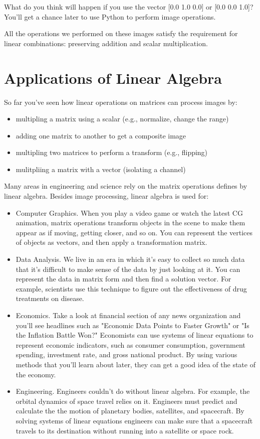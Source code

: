 What do you think will happen if you use the vector [0.0 1.0 0.0] or [0.0 0.0 1.0]? You'll get a chance later to use Python to perform image operations.

All the operations we performed on these images satisfy the requirement for linear combinations: preserving addition and scalar multiplication. 


\section{Applications of Linear Algebra}

So far you've seen how linear operations on matrices can process images by:
\begin{itemize}
\item multipling a matrix using a scalar (e.g., normalize, change the range)
\item adding one matrix to another to get a composite image 
\item multipling two matrices to perform a transform (e.g., flipping)
\item mulitpliing a matrix with a vector (isolating a channel)
\end{itemize}

Many areas in engineering and science rely on the matrix operations defines by linear algebra. Besides image processing, linear algebra is used for: 
\begin{itemize}
\item Computer Graphics. When you play a video game or watch the latest CG animation, matrix operations transform objects in the scene to make them appear as if moving, getting closer, and so on. You can represent the vertices of objects as vectors, and then apply a transformation matrix.
\item Data Analysis. We live in an era in which it's easy to collect so much data that it's difficult to make sense of the data by just looking at it. You can represent the data in matrix form and then find a solution vector. For example, scientists use this technique to figure out the effectiveness of drug treatments on disease.
\item Economics. Take a look at financial section of any news organization and you'll see headlines such as "Economic Data Points to Faster Growth" or "Is the Inflation Battle Won?" Economists can use systems of linear equations to represent economic indicators, such as consumer consumption, government spending, investment rate, and gross national product. By using various methods that you'll learn about later, they can get a good idea of the state of the economy.
\item Engineering. Engineers couldn't do without linear algebra. For example, the orbital dynamics of space travel relies on it. Engineers must predict and calculate the the motion of planetary bodies, satellites, and spacecraft. By solving systems of linear equations engineers can make sure that a spacecraft travels to its destination without running into a satellite or space rock.
\end{itemize}

